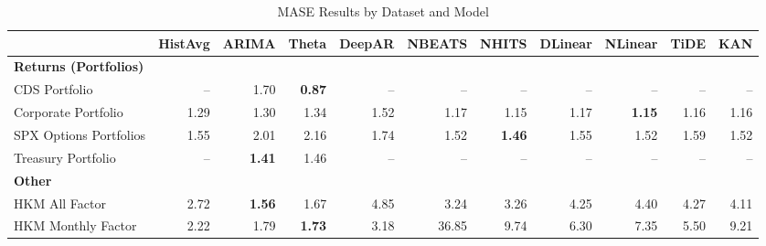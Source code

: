 
\begin{table}[htbp]
\centering
\caption{MASE Results by Dataset and Model}
\label{tab:mase_results}
\scriptsize
\setlength{\tabcolsep}{1.5pt}
\renewcommand{\arraystretch}{0.9}
\begin{tabular}{@{}lrrrrrrrrrr@{}}
\toprule
 & HistAvg & ARIMA & Theta & DeepAR & NBEATS & NHITS & DLinear & NLinear & TiDE & KAN \\
\midrule
\multicolumn{11}{l}{\textbf{Returns (Portfolios)}} \\
CDS Portfolio & -- & 1.70 & \textbf{0.87} & -- & -- & -- & -- & -- & -- & -- \\
Corporate Portfolio & 1.29 & 1.30 & 1.34 & 1.52 & 1.17 & 1.15 & 1.17 & \textbf{1.15} & 1.16 & 1.16 \\
SPX Options Portfolios & 1.55 & 2.01 & 2.16 & 1.74 & 1.52 & \textbf{1.46} & 1.55 & 1.52 & 1.59 & 1.52 \\
Treasury Portfolio & -- & \textbf{1.41} & 1.46 & -- & -- & -- & -- & -- & -- & -- \\
\midrule
\multicolumn{11}{l}{\textbf{Other}} \\
HKM All Factor & 2.72 & \textbf{1.56} & 1.67 & 4.85 & 3.24 & 3.26 & 4.25 & 4.40 & 4.27 & 4.11 \\
HKM Monthly Factor & 2.22 & 1.79 & \textbf{1.73} & 3.18 & 36.85 & 9.74 & 6.30 & 7.35 & 5.50 & 9.21 \\
\bottomrule
\end{tabular}
\vspace{0.1cm}

\end{table}
